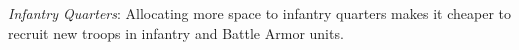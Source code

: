 \emph{Infantry Quarters}: Allocating more space to infantry quarters makes it cheaper to recruit new troops in infantry and Battle Armor units.
